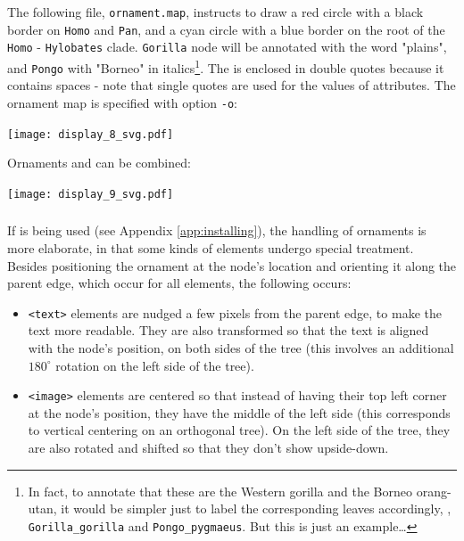 The following file, \texttt{ornament.map}, instructs to draw a red circle with
a black border on \texttt{Homo} and \texttt{Pan}, and a cyan circle with a blue
border on the root of the \texttt{Homo} - \texttt{Hylobates} clade.
\texttt{Gorilla} node will be annotated with the word "plains", and
\texttt{Pongo} with "Borneo" in italics\footnote{In fact, to annotate that these
are the Western gorilla and the Borneo orang-utan, it would be simpler just to
label the corresponding leaves accordingly, \ie, \texttt{Gorilla\_gorilla} and
\texttt{Pongo\_pygmaeus}. But this is just an example\ldots}. The \svg{}
is enclosed in double quotes because it contains spaces - note that single
quotes are used for the values of \xml{} attributes. The ornament map is
specified with option \texttt{-o}:
\begin{quote}
 
\end{quote}

\begin{center}
 \texttt{[image: display\_8\_svg.pdf]}
\end{center}

\noindent{}Ornaments and \css{} can be combined:


\begin{center}
 \texttt{[image: display\_9\_svg.pdf]}
\end{center}

\subsubsection{\libxml}
\label{sct:display:libxml}

If \libxml{} is being used (see Appendix \ref{app:installing}), the handling of ornaments is more elaborate, in that some kinds of elements undergo special treatment. Besides positioning the ornament at the node's location and orienting it along the parent edge, which occur for all elements, the following occurs:
\begin{itemize}
	\item \texttt{<text>} elements are nudged a few pixels from the parent edge,
	to make the text more readable. They are also transformed so that the text
	is aligned with the node's position, on both sides of the tree (this
	involves an additional $180^{\circ}$  rotation on the left side of the
	tree).
	\item \texttt{<image>} elements are centered so that instead of having
	their top left corner at the node's position, they have the middle of the
	left side (this corresponds to vertical centering on an orthogonal tree).
	On the left side of the tree, they are also rotated and shifted so that
	they don't show upside-down.
\end{itemize}

